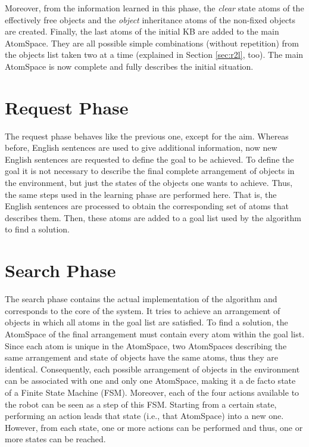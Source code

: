 Moreover, from the information learned in this phase, the \textit{clear} state atoms of the effectively free objects and the \textit{object} inheritance atoms of the non-fixed objects are created.  
Finally, the last atoms of the initial KB are added to the main AtomSpace. They are all possible simple combinations (without repetition) from the objects list taken two at a time (explained in Section \ref{sec:r2l}, too). 
The main AtomSpace is now complete and fully describes the initial situation. 

\section{Request Phase}\label{sec:request}

The request phase behaves like the previous one, except for the aim. Whereas before, English sentences are used to give additional information, now new English sentences are requested to define the goal to be achieved. 
To define the goal it is not necessary to describe the final complete arrangement of objects in the environment, but just the states of the objects one wants to achieve. 
Thus, the same steps used in the learning phase are performed here. That is, the English sentences are processed to obtain the corresponding set of atoms that describes them. Then, these atoms are added to a goal list used by the algorithm to find a solution.

\section{Search Phase}\label{sec:search}

The search phase contains the actual implementation of the algorithm and corresponds to the core of the system. It tries to achieve an arrangement of objects in which all atoms in the goal list are satisfied.
To find a solution, the AtomSpace of the final arrangement must contain every atom within the goal list. \\

Since each atom is unique in the AtomSpace, two AtomSpaces describing the same arrangement and state of objects have the same atoms, thus they are identical. 
Consequently, each possible arrangement of objects in the environment can be associated with one and only one AtomSpace, making it a de facto state of a Finite State Machine (FSM).
Moreover, each of the four actions available to the robot can be seen as a step of this FSM. 
Starting from a certain state, performing an action leads that state (i.e., that AtomSpace) into a new one. However, from each state, one or more actions can be performed and thus, one or more states can be reached. \\


